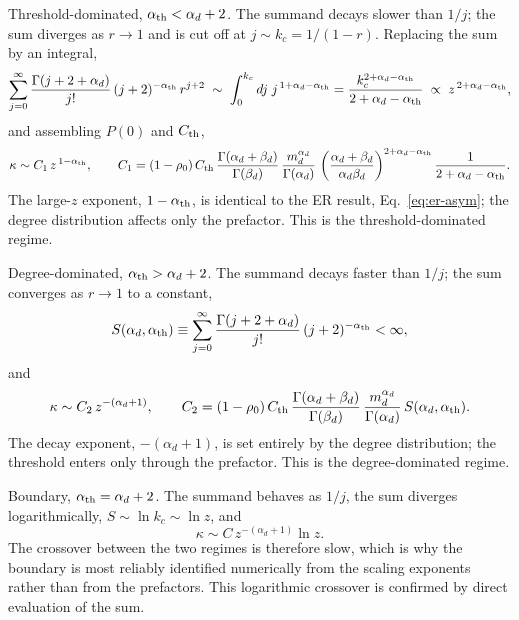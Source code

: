 \documentclass[]{revtex4-2}
\begin{document}
Threshold-dominated, $\alpha_{\rm th}<\alpha_d+2$. The summand decays slower than $1/j$; the sum diverges as $r\to1$ and is cut off at $j\sim k_c = 1/(1-r)$. Replacing the sum by an integral,
\begin{equation}
    \sum_{j=0}^{\infty} \frac{\Gamma(j+2+\alpha_d)}{j!}\,(j+2)^{-\alpha_{\rm th}}\,r^{j+2}
    \;\sim\; \int_0^{k_c} dj\; j^{\,1+\alpha_d-\alpha_{\rm th}}
    = \frac{k_c^{2+\alpha_d-\alpha_{\rm th}}}{2+\alpha_d-\alpha_{\rm th}}
    \;\propto\; z^{\,2+\alpha_d-\alpha_{\rm th}},
\end{equation}
and assembling $P(0)$ and $C_{\rm th}$,
\begin{equation}
    \kappa \sim C_1\, z^{\,1-\alpha_{\rm th}},
    \qquad
    C_1 = (1-\rho_0)\,C_{\rm th}\,
    \frac{\Gamma(\alpha_d+\beta_d)}{\Gamma(\beta_d)}\,
    \frac{m_d^{\alpha_d}}{\Gamma(\alpha_d)}\,
    \left(\frac{\alpha_d+\beta_d}{\alpha_d\beta_d}\right)^{2+\alpha_d-\alpha_{\rm th}}
    \frac{1}{2+\alpha_d-\alpha_{\rm th}} .
\end{equation}
The large-$z$ exponent, $1-\alpha_{\rm th}$, is identical to the ER result, Eq.~\eqref{eq:er-asym}; the degree distribution affects only the prefactor. This is the threshold-dominated regime.

Degree-dominated, $\alpha_{\rm th}>\alpha_d+2$. The summand decays faster than $1/j$; the sum converges as $r\to1$ to a constant,
\begin{equation}
    S(\alpha_d,\alpha_{\rm th}) \equiv
    \sum_{j=0}^{\infty} \frac{\Gamma(j+2+\alpha_d)}{j!}\,(j+2)^{-\alpha_{\rm th}} < \infty ,
\end{equation}
and
\begin{equation}
    \kappa \sim C_2\, z^{-(\alpha_d+1)},
    \qquad
    C_2 = (1-\rho_0)\,C_{\rm th}\,
    \frac{\Gamma(\alpha_d+\beta_d)}{\Gamma(\beta_d)}\,
    \frac{m_d^{\alpha_d}}{\Gamma(\alpha_d)}\,
    S(\alpha_d,\alpha_{\rm th}) .
\end{equation}
The decay exponent, $-(\alpha_d+1)$, is set entirely by the degree distribution; the threshold enters only through the prefactor. This is the degree-dominated regime.

Boundary, $\alpha_{\rm th}=\alpha_d+2$. The summand behaves as $1/j$, the sum diverges logarithmically, $S\sim\ln k_c\sim\ln z$, and
\begin{equation}
    \kappa \sim C\,z^{-(\alpha_d+1)}\ln z .
\end{equation}
The crossover between the two regimes is therefore slow, which is why the boundary is most reliably identified numerically from the scaling exponents rather than from the prefactors. This logarithmic crossover is confirmed by direct evaluation of the sum.
\end{document}
